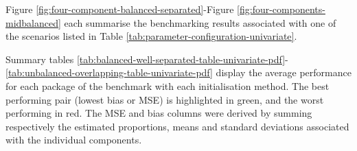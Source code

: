 \begin{table}[!h]

\caption{\label{tab:parameter-configuration-univariate}The 9 parameter configurations tested to generate the samples of the univariate experiment, with $k=4$ components.}
\centering
{}
\end{table}

Figure \ref{fig:four-component-balanced-separated}-Figure
\ref{fig:four-components-midbalanced} each summarise the benchmarking
results associated with one of the scenarios listed in Table
\ref{tab:parameter-configuration-univariate}.

Summary tables \ref{tab:balanced-well-separated-table-univariate-pdf}-
\ref{tab:unbalanced-overlapping-table-univariate-pdf}
display the average performance for each package of the benchmark with
each initialisation method. The best performing pair (lowest bias or
MSE) is highlighted in green, and the worst performing in red. The MSE and bias columns were derived by summing respectively the estimated proportions, means and standard deviations associated with the
individual components.

